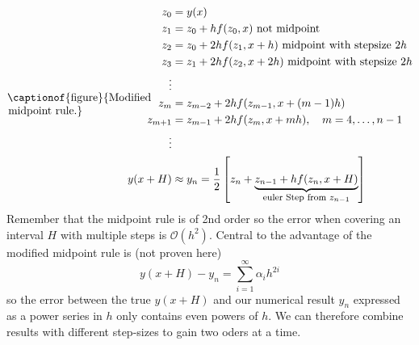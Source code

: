 \begin{equation}
  \vcenter{\hbox{\begin{minipage}{0.2\textwidth}
  \centering
  
  \captionof{figure}{Modified midpoint rule.}
  \end{minipage}}}
  \qquad\qquad
  \begin{aligned}
      z_0 &= y(x) \\
      z_1 &= z_0 + h f(z_0, x) \text{ not midpoint}\\
      z_2 &= z_0 + 2h f(z_1, x + h) \text{ midpoint with stepsize } 2h\\
      z_3 &= z_1 + 2h f(z_2, x + 2h) \text{ midpoint with stepsize } 2h\\
      \vdots \\
      z_m &= z_{m-2} + 2hf(z_{m-1},x+(m-1)h) \\
      z_{m + 1} &= z_{m-1} + 2hf(z_{m},x+mh), \quad m=4,\dots,n-1 \\
      \vdots \\
      y(x+H) &\approx y_n = \frac{1}{2} \left[ z_n + \explain{z_{n-1} + hf(z_n,x+H)}{euler Step from $z_{n-1}$} \right]
  \end{aligned}
\end{equation}
Remember that the midpoint rule is of 2nd order so the error when covering an interval $H$ with multiple steps
is $\mathcal{O}(h^2)$. Central to the advantage of the modified midpoint rule is (not proven here)
\begin{equation}
  y(x+H) - y_n = \sum_{i=1}^{\infty} \alpha_i h^{2i}
\end{equation}
so the error between the true $y(x+H)$ and our numerical result $y_n$ expressed as a power
series in $h$ only contains even powers of $h$. \textcolor{green1}{We can therefore combine results
with different step-sizes to gain two oders at a time}.

